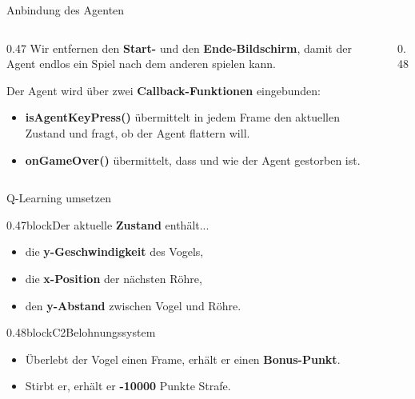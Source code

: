 \begin{frame}{Anbindung des Agenten}
\small
\begin{columns}
\begin{column}{0.47\textwidth}
Wir entfernen den \textbf{Start-} und den \textbf{Ende-Bildschirm}, damit der Agent endlos ein Spiel nach dem anderen spielen kann.

\vspace{0.5em}
Der Agent wird über zwei \textbf{Callback-Funktionen} eingebunden:
\begin{itemize}
\item \textbf{isAgentKeyPress()} übermittelt in jedem Frame den aktuellen Zustand und fragt, ob der Agent flattern will.
\item \textbf{onGameOver()} übermittelt, dass und wie der Agent gestorben ist.
\end{itemize}
\end{column}
\begin{column}{0.48\textwidth}

\end{column}
\end{columns}
\end{frame}

\begin{frame}{Q-Learning umsetzen}
\begin{blockrow}
  \begin{blockcol}{0.47\textwidth}{block}{Der aktuelle \textbf{Zustand} enthält...}
\begin{itemize}
\item die \textbf{y-Geschwindigkeit} des Vogels,
\item die \textbf{x-Position} der nächsten Röhre,
\item den \textbf{y-Abstand} zwischen Vogel und Röhre.
\end{itemize}
  \end{blockcol}
  \begin{blockcol}{0.48\textwidth}{blockC2}{Belohnungssystem}
\begin{itemize}
\item Überlebt der Vogel einen Frame, erhält er einen \textbf{Bonus-Punkt}.
\item Stirbt er, erhält er \textbf{-10000} Punkte Strafe.
\end{itemize}
  \end{blockcol}
\end{blockrow}
\end{frame}


